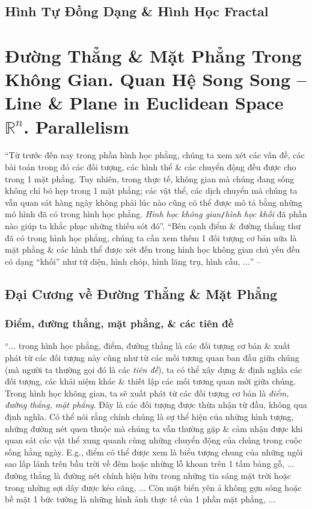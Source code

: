 \documentclass[oneside]{book}
\numberwithin{equation}{section}
\begin{document}

\section{Hình Tự Đồng Dạng \& Hình Học Fractal}


\chapter{Đường Thẳng \& Mặt Phẳng Trong Không Gian. Quan Hệ Song Song -- Line \& Plane in Euclidean Space $\mathbb{R}^n$. Parallelism}

``Từ trước đến nay trong phần hình học phẳng, chúng ta xem xét các vấn đề, các bài toán trong đó các đối tượng, các hình thể \& các chuyển động đều được cho trong 1 mặt phẳng. Tuy nhiên, trong thực tế, không gian mà chúng đang sống không chỉ bó hẹp trong 1 mặt phẳng; các vật thể, các dịch chuyển mà chúng ta vẫn quan sát hàng ngày không phải lúc nào cũng có thể được mô tả bằng những mô hình đã có trong hình học phẳng. \textit{Hình học không gian}\texttt{/}\textit{hình học khối} đã phần nào giúp ta khắc phục những thiếu sót đó''. ``Bên cạnh điểm \& đường thẳng thư đã có trong hình học phẳng, chúng ta cần xem thêm 1 đối tượng cơ bản nữa là mặt phẳng \& các hình thể được xét đến trong hình học không gian chủ yếu đều có dạng ``khối'' như tứ diện, hình chóp, hình lăng trụ, hình cầu, $\ldots$'' -- \cite[p. 43]{TL_chuyen_Toan_Hinh_Hoc_11}

\section{Đại Cương về Đường Thẳng \& Mặt Phẳng}

\subsection{Điểm, đường thẳng, mặt phẳng, \& các tiên đề}
``$\ldots$ trong hình học phẳng, điểm, đường thẳng là các đối tượng cơ bản \& xuất phát từ các đối tượng này cũng như từ các mối tương quan ban đầu giữa chúng (mà người ta thường gọi đó là các \textit{tiên đề}), ta có thể xây dựng \& định nghĩa các đối tượng, các khái niệm khác \& thiết lập các mối tương quan mới giữa chúng. Trong hình học không gian, ta sẽ xuất phát từ các đối tượng cơ bản là \textit{điểm, đường thẳng, mặt phẳng}. Đây là các đối tượng được thừa nhận từ đầu, không qua định nghĩa. Có thể nói rằng chính chúng là sự thể hiện của những hình tượng, những đường nét quen thuộc mà chúng ta vẫn thường gặp \& cảm nhận được khi quan sát các vật thể xung quanh cùng những chuyển động của chúng trong cuộc sống hằng ngày. E.g., điểm có thể được xem là biểu tượng chung của những ngôi sao lấp lánh trên bầu trời về đêm hoặc những lỗ khoan trên 1 tấm bảng gỗ, $\ldots$ đường thẳng là đường nét chính hiện hữu trong những tia sáng mặt trời hoặc trong những sợi dây được kéo căng, $\ldots$ Còn mặt biển yên ả không gợn sóng hoặc bề mặt 1 bức tường là những hình ảnh thực tế của 1 phần mặt phẳng, $\ldots$
\end{document}
